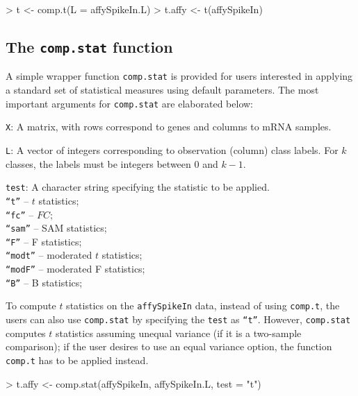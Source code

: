 \documentclass[11pt]{article}
\newcommand{\code}[1]{{\tt #1}}
\newcommand{\Rfunc}[1]{{\tt #1}}
\begin{document}
\begin{Schunk}
\begin{Sinput}
> t <- comp.t(L = affySpikeIn.L)
> t.affy <- t(affySpikeIn)
\end{Sinput}
\end{Schunk}

\subsection{The \Rfunc{comp.stat} function}
A simple wrapper function \Rfunc{comp.stat} is provided for users interested 
in applying a standard set of statistical measures using default parameters. 
The most important arguments for \Rfunc{comp.stat} are elaborated below:

\begin{description}
\item
  {\code{X}: }{ A  matrix, with rows correspond to genes and columns
          to mRNA samples. }
\item
  {\code{L}: }{ A vector of integers corresponding to observation (column)
          class labels. For $k$ classes, the labels must be integers
          between 0 and $k-1$. }
\item
  {\code{test}: }{ A character string specifying the statistic to be applied.\\
    \code{``t''} -- $t$ statistics;\\
    \code{``fc''} -- $FC$;\\
    \code{``sam''} -- SAM statistics;\\
    \code{``F''} -- F statistics;\\
    \code{``modt''} -- moderated $t$ statistics;\\
    \code{``modF''} -- moderated F statistics;\\
    \code{``B''} -- B statistics;}
\end{description}

To compute $t$ statistics on the \code{affySpikeIn} data, instead of using
\Rfunc{comp.t}, the users can also use \Rfunc{comp.stat} by specifying 
the \code{test} as \code{``t''}. However, \Rfunc{comp.stat} computes $t$ 
statistics assuming unequal variance (if it is a two-sample comparison); if
the user desires to use an equal variance option, the function \Rfunc{comp.t}
has to be applied instead.

\begin{Schunk}
\begin{Sinput}
> t.affy <- comp.stat(affySpikeIn, affySpikeIn.L, test = "t")
\end{Sinput}
\end{Schunk}
\end{document}
